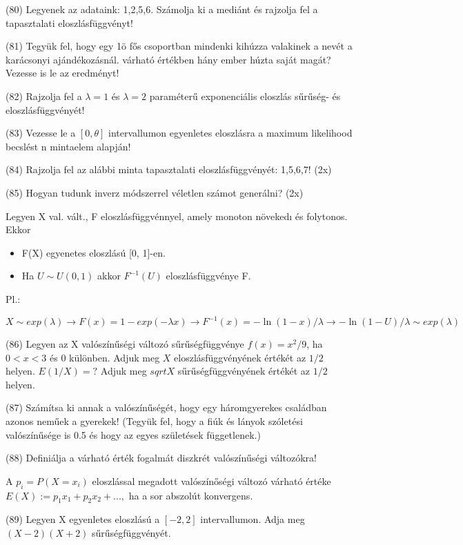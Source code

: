 \documentclass[12p]{article}
\begin{document}
(80) Legyenek az adataink: 1,2,5,6. Számolja ki a mediánt és rajzolja fel a tapasztalati eloszlásfüggvényt!

(81) Tegyük fel, hogy egy 1ö fős csoportban mindenki kihúzza valakinek a nevét a karácsonyi ajándékozásnál. várható értékben hány ember húzta saját magát? Vezesse is le az eredményt!

(82) Rajzolja fel a $\lambda = 1$ és $\lambda = 2$ paraméterű exponenciális eloszlás sűrűség- és eloszlásfüggvényét!

(83) Vezesse le a $[0, \theta]$ intervallumon egyenletes eloszlásra a maximum likelihood becslést n mintaelem alapján!

(84) Rajzolja fel az alábbi minta tapasztalati eloszlásfüggvényét: 1,5,6,7! (2x)

(85) Hogyan tudunk inverz módszerrel véletlen számot generálni? (2x)

Legyen X val. vált., F eloszlásfüggvénnyel,
amely monoton növekedı és folytonos. Ekkor

\begin{itemize}
	\item F(X) egyenetes eloszlású [0, 1]-en.
	\item Ha $U \sim U(0, 1)$ akkor $F^{-1}(U)$ eloszlásfüggvénye F.
\end{itemize}

Pl.:

$$X \sim exp(\lambda) \rightarrow F(x) = 1-exp(-\lambda x) \rightarrow F^{-1}(x) = -\ln (1-x)/\lambda \rightarrow -\ln(1-U)/\lambda \sim exp(\lambda)$$

(86) Legyen az X valószínűségi változó sűrűségfüggvénye $f(x) = x^2/9$, ha $0 < x < 3$ és $0$ különben. Adjuk meg $X$ eloszlásfüggvényének értékét az $1/2$ helyen. $E(1/X)=?$ Adjuk meg $sqrt{X}$ sűrűségfüggvényének értékét az $1/2$ helyen.

(87) Számítsa ki annak a valószínűségét, hogy egy háromgyerekes családban azonos neműek a gyerekek! (Tegyük fel, hogy a fiúk és lányok szóletési valószínűsége is 0.5 és hogy az egyes születések függetlenek.)

(88) Definiálja a várható érték fogalmát diszkrét valószínűségi változókra!

A $p_i =P (X=x_i)$ eloszlással megadott valószínőségi változó várható értéke $E(X):= p_1x_1+ p_2x_2 +...,$ ha a sor abszolút konvergens.

(89)  Legyen X egyenletes eloszlású a $[-2,2]$ intervallumon. Adja meg $(X - 2)(X + 2)$ sűrűségfüggvényét.
\end{document}
